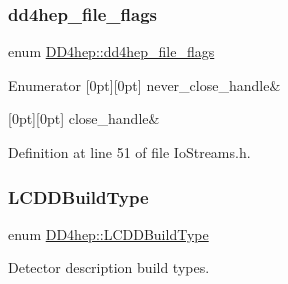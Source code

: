 \subsubsection{\texorpdfstring{dd4hep\+\_\+file\+\_\+flags}{dd4hep\_file\_flags}}
{\footnotesize\ttfamily enum \hyperlink{namespace_d_d4hep_a31d19f9b0ce567067d2897fbda1761e5}{D\+D4hep\+::dd4hep\+\_\+file\+\_\+flags}}

\begin{DoxyEnumFields}{Enumerator}
[0pt][0pt]{}\hypertarget{namespace_d_d4hep_a31d19f9b0ce567067d2897fbda1761e5a80c25250166976170fd59e1f3ee5041b}{}\label{namespace_d_d4hep_a31d19f9b0ce567067d2897fbda1761e5a80c25250166976170fd59e1f3ee5041b} 
never\+\_\+close\+\_\+handle&\\
\hline

[0pt][0pt]{}\hypertarget{namespace_d_d4hep_a31d19f9b0ce567067d2897fbda1761e5a99e11053d1afb0cb43c6a30f93741e76}{}\label{namespace_d_d4hep_a31d19f9b0ce567067d2897fbda1761e5a99e11053d1afb0cb43c6a30f93741e76} 
close\+\_\+handle&\\
\hline

\end{DoxyEnumFields}


Definition at line 51 of file Io\+Streams.\+h.

\hypertarget{namespace_d_d4hep_acafe43ba4537ab6e999e808142965fab}{}\label{namespace_d_d4hep_acafe43ba4537ab6e999e808142965fab} 
\subsubsection{\texorpdfstring{L\+C\+D\+D\+Build\+Type}{LCDDBuildType}}
{\footnotesize\ttfamily enum \hyperlink{namespace_d_d4hep_acafe43ba4537ab6e999e808142965fab}{D\+D4hep\+::\+L\+C\+D\+D\+Build\+Type}}



Detector description build types. 


